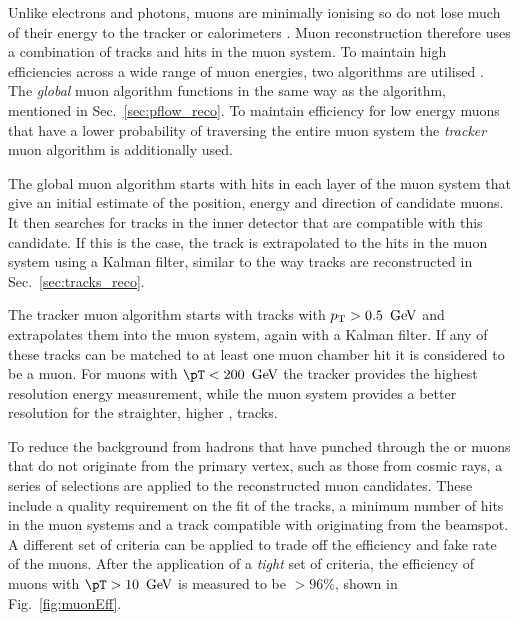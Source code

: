 Unlike electrons and photons, muons are minimally ionising so do not
lose much of their energy to the tracker or calorimeters
\cite{Chatrchyan:2008aa}. Muon reconstruction therefore
uses a combination of tracks and hits in the muon system. To maintain
high efficiencies across a wide range of muon energies, two algorithms are
utilised \cite{1748-0221-7-10-P10002}. The \emph{global} muon algorithm
functions in the same way as the \PF algorithm, mentioned in
Sec.~\ref{sec:pflow_reco}. To maintain efficiency for low energy muons
that have a lower probability of traversing the entire muon system
the \emph{tracker} muon algorithm is additionally used.

The global muon algorithm starts with hits in each layer of the muon
system that give an initial estimate of the position, energy and
direction of candidate muons. It then searches for tracks in the inner
detector that are compatible with this candidate. If this is the case,
the track is extrapolated to the hits in the muon system using a
Kalman filter, similar to the way tracks are reconstructed in
Sec.~\ref{sec:tracks_reco}. 

The tracker muon algorithm starts with tracks with ${p_{\text T}}>0.5~\mathrm{\,Ge\kern -0.1em V}$ and
extrapolates them into the muon system, again with a Kalman filter. If
any of these tracks can be matched to at least one muon chamber hit it
is considered to be a muon. For muons with $\pT<200~\gev$ the tracker
provides the highest resolution energy measurement, while the muon
system provides a better resolution for the straighter, higher \pT,
tracks.

To reduce the background from hadrons that have punched through the
\HCAL or muons that do not originate from the primary vertex, such as
those from cosmic
rays, a series of selections are applied to the reconstructed
muon candidates. These include a quality requirement on the fit of the
tracks, a minimum number of hits in the muon systems and a track
compatible with originating from the beamspot. A different set of
criteria can be applied to trade off the efficiency and fake rate of
the muons. After the application of a \emph{tight} set of criteria, the
efficiency of muons with $\pT>10~\gev$ is measured to be $>96\%$,
shown in Fig.~\ref{fig:muonEff}.

